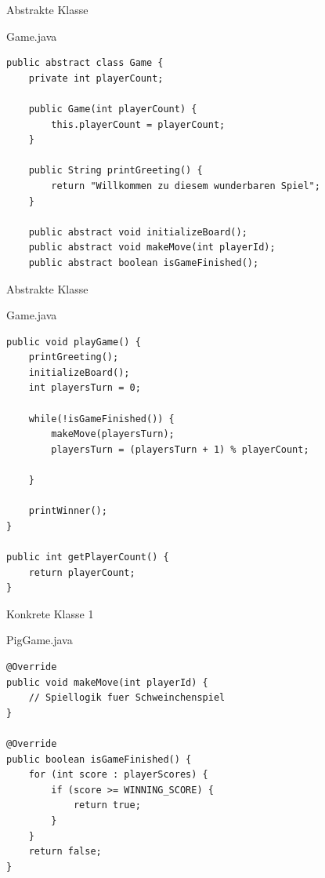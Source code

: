 
\begin{frame}[fragile]{Abstrakte Klasse}
	\begin{exampleblock}{Game.java}
 		\begin{lstlisting}
public abstract class Game {
	private int playerCount;
	
	public Game(int playerCount) {
		this.playerCount = playerCount;
	}
	
	public String printGreeting() {
		return "Willkommen zu diesem wunderbaren Spiel";
	}
	
	public abstract void initializeBoard();
	public abstract void makeMove(int playerId);
	public abstract boolean isGameFinished();
 		\end{lstlisting}
 	\end{exampleblock}
\end{frame}

\begin{frame}[fragile]{Abstrakte Klasse}
	\begin{exampleblock}{Game.java}
 		\begin{lstlisting}
public void playGame() {
    printGreeting();
    initializeBoard();
    int playersTurn = 0;
    
    while(!isGameFinished()) {
        makeMove(playersTurn);
        playersTurn = (playersTurn + 1) % playerCount;
        
    }
    
    printWinner();
}

public int getPlayerCount() {
    return playerCount;
} 		    
 		\end{lstlisting}
 	\end{exampleblock}
\end{frame}

\begin{frame}[fragile]{Konkrete Klasse 1}
	\begin{exampleblock}{PigGame.java}
 		\begin{lstlisting}
@Override
public void makeMove(int playerId) {
    // Spiellogik fuer Schweinchenspiel
}

@Override
public boolean isGameFinished() {
    for (int score : playerScores) {
        if (score >= WINNING_SCORE) {
            return true;
        }
    }
    return false;
}
 		\end{lstlisting}
 	\end{exampleblock}
\end{frame}

